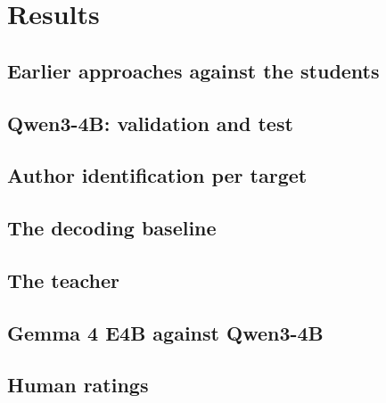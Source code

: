 \chapter{Results}\label{ch:results}

\section{Earlier approaches against the students}

\section{Qwen3-4B: validation and test}

\section{Author identification per target}

\section{The decoding baseline}

\section{The teacher}

\section{Gemma 4 E4B against Qwen3-4B}

\section{Human ratings}
